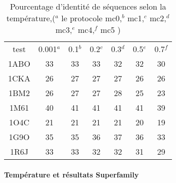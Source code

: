     \begin{table}[!htbp]
      \centering

      \begin{tabular}{ccccccc}
      
        \toprule
         test & 0.001$^a$ & 0.1$^b$ & 0.2$^c$  & 0.3$^d$ & 0.5$^e$ & 0.7$^f$  \\
        \cmidrule{1-7}
        1ABO & 33 & 33 & 33 & 32 & 32  & 30 \\      
        1CKA & 26 & 27 & 27 & 27 & 26  & 26 \\  
        1BM2 & 26 & 27 & 27 & 28 & 25  & 23 \\  
        1M61 & 40 & 41 & 41 & 41 & 41  & 39 \\  
        1O4C & 21 & 21 & 21 & 21 & 20  & 19 \\  
        1G9O & 35 & 35 & 36 & 37 & 36  & 33 \\  
        1R6J & 33 & 33 & 32 & 32 & 31  & 29 \\  
        \bottomrule
        
      \end{tabular}
      

      \caption{Pourcentage d'identité de séquences selon la température,($^a$ le protocole mc0,$^b$ mc1,$^c$  mc2,$^d$ mc3,$^e$ mc4,$^f$ mc5 )}      
      \label{tab:ident_mc}
    \end{table}



   \paragraph{Température et résultats Superfamily} 

